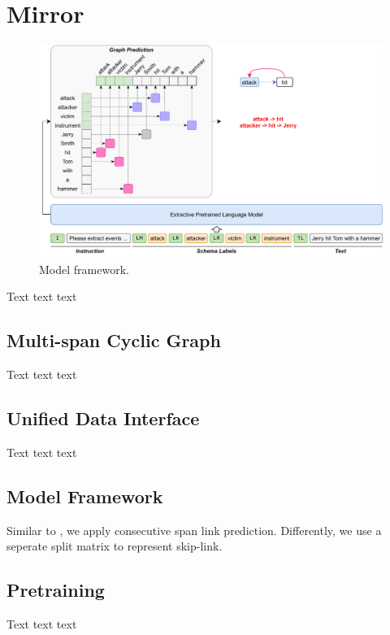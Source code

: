 \section{Mirror}

\begin{figure}[t]
    \centering
    \includegraphics[width=\textwidth]{figs/Model Framework.pdf}
    \caption{Model framework.}
    \label{fig:model-framework}
\end{figure}

Text text text

\subsection{Multi-span Cyclic Graph}

Text text text

\subsection{Unified Data Interface}

Text text text

\subsection{Model Framework}

Similar to \citet{li-et-al-w2ner}, we apply consecutive span link prediction.
Differently, we use a seperate split matrix to represent skip-link.

\subsection{Pretraining}

Text text text
